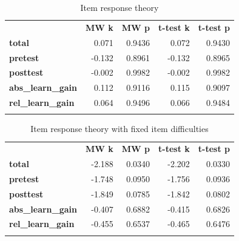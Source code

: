 \begin{longtable}[c]{@{}lrrrr@{}}
\caption{Item response theory}
\endfirsthead
\endhead
\toprule\addlinespace
& \textbf{MW k} & \textbf{MW p} &
\textbf{t-test k} & \textbf{t-test p}
\\\addlinespace
\midrule
\textbf{total} & 0.071 & 0.9436 & 0.072 & 0.9430
\\\addlinespace
\textbf{pretest} & -0.132 & 0.8961 & -0.132 & 0.8965
\\\addlinespace
\textbf{posttest} & -0.002 & 0.9982 & -0.002 & 0.9982
\\\addlinespace
\textbf{abs\_learn\_gain} & 0.112 & 0.9116 & 0.115 & 0.9097
\\\addlinespace
\textbf{rel\_learn\_gain} & 0.064 & 0.9496 & 0.066 & 0.9484
\\\addlinespace
\bottomrule
    \label{tab:comp_cond_irt_comp}
\end{longtable}

\begin{longtable}[c]{@{}lrrrr@{}}
\caption{Item response theory with fixed item difficulties}
\endfirsthead
\endhead
\toprule\addlinespace
& \textbf{MW k} & \textbf{MW p} &
\textbf{t-test k} & \textbf{t-test p}
\\\addlinespace
\midrule
\textbf{total} & -2.188 & 0.0340 & -2.202 & 0.0330
\\\addlinespace
\textbf{pretest} & -1.748 & 0.0950 & -1.756 & 0.0936
\\\addlinespace
\textbf{posttest} & -1.849 & 0.0785 & -1.842 & 0.0802
\\\addlinespace
\textbf{abs\_learn\_gain} & -0.407 & 0.6882 & -0.415 & 0.6826
\\\addlinespace
\textbf{rel\_learn\_gain} & -0.455 & 0.6537 & -0.465 & 0.6476
\\\addlinespace
\bottomrule
    \label{tab:comp_cond_adj_irt_comp}
\end{longtable}

